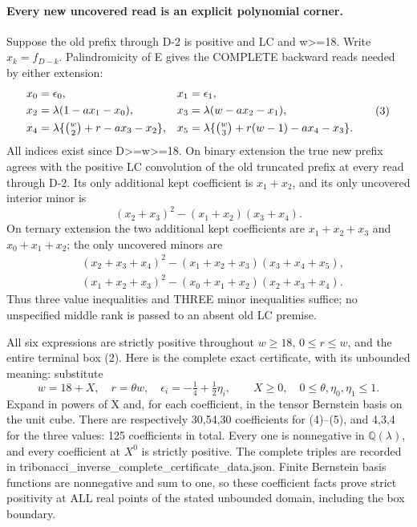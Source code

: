 \paragraph{Every new uncovered read is an explicit polynomial corner.}
Suppose the old prefix through D-2 is positive and LC and w>=18.
Write $x_k=f_{D-k}$. Palindromicity of E gives the COMPLETE backward
reads needed by either extension:
\[
\begin{aligned}
 x_0&=\epsilon_0,&x_1&=\epsilon_1,\\
 x_2&=\lambda(1-ax_1-x_0),&
 x_3&=\lambda(w-ax_2-x_1),\\
 x_4&=\lambda\{\tbinom w2+r-ax_3-x_2\},&
 x_5&=\lambda\{\tbinom w3+r(w-1)-ax_4-x_3\}.
\end{aligned}                                                   \tag{3}
\]
All indices exist since D>=w>=18. On binary extension the true new
prefix agrees with the positive LC convolution of the old truncated
prefix at every read through D-2. Its only additional kept coefficient
is $x_1+x_2$, and its only uncovered interior minor is
\[
                 (x_2+x_3)^2-(x_1+x_2)(x_3+x_4).             \tag{4}
\]
On ternary extension the two additional kept coefficients are
$x_1+x_2+x_3$ and $x_0+x_1+x_2$; the only uncovered minors are
\[
\begin{split}
 &(x_2+x_3+x_4)^2-(x_1+x_2+x_3)(x_3+x_4+x_5),\\
 &(x_1+x_2+x_3)^2-(x_0+x_1+x_2)(x_2+x_3+x_4).              \tag{5}
\end{split}
\]
Thus three value inequalities and THREE minor inequalities suffice;
no unspecified middle rank is passed to an absent old LC premise.

All six expressions are strictly positive throughout
$w\ge18$, $0\le r\le w$, and the entire terminal box (2).
Here is the complete exact certificate, with its unbounded meaning:
substitute
\[
 w=18+X,\quad r=\theta w,\quad
 \epsilon_i=-\tfrac14+\tfrac12\eta_i,
 \qquad X\ge0,\quad0\le\theta,\eta_0,\eta_1\le1.
\]
Expand in powers of X and, for each coefficient, in the tensor
Bernstein basis on the unit cube. There are respectively
30,54,30 coefficients for (4)--(5), and 4,3,4 for the three values:
125 coefficients in total. Every one is nonnegative in
$\mathbb Q(\lambda)$, and every coefficient at $X^0$ is strictly
positive. The complete triples are recorded in
tribonacci_inverse_complete_certificate_data.json.
Finite Bernstein basis functions are nonnegative and sum to one,
so these coefficient facts prove strict positivity at ALL real
points of the stated unbounded domain, including the box boundary.


